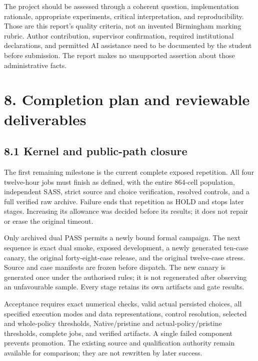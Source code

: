 \documentclass[11pt,a4paper]{article}
\begin{document}
The project should be assessed through a coherent question, implementation rationale, appropriate experiments, critical interpretation, and reproducibility. Those are this report's quality criteria, not an invented Birmingham marking rubric. Author contribution, supervisor confirmation, required institutional declarations, and permitted AI assistance need to be documented by the student before submission. The report makes no unsupported assertion about those administrative facts.


\clearpage

\section*{8. Completion plan and reviewable deliverables}


\subsection*{8.1 Kernel and public-path closure}

The first remaining milestone is the current complete exposed repetition. All four twelve-hour jobs must finish as defined, with the entire 864-cell population, independent SASS, strict source and choice verification, resolved controls, and a full verified raw archive. Failure ends that repetition as HOLD and stops later stages. Increasing its allowance was decided before its results; it does not repair or erase the original timeout.


Only archived dual PASS permits a newly bound formal campaign. The next sequence is exact dual smoke, exposed development, a newly generated ten-case canary, the original forty-eight-case release, and the original twelve-case stress. Source and case manifests are frozen before dispatch. The new canary is generated once under the authorised rules; it is not regenerated after observing an unfavourable sample. Every stage retains its own artifacts and gate results.


Acceptance requires exact numerical checks, valid actual persisted choices, all specified execution modes and data representations, control resolution, selected and whole-policy thresholds, Native/\allowbreak{}pristine and actual-policy/\allowbreak{}pristine thresholds, complete jobs, and verified artifacts. A single failed component prevents promotion. The existing source and qualification authority remain available for comparison; they are not rewritten by later success.
\end{document}
